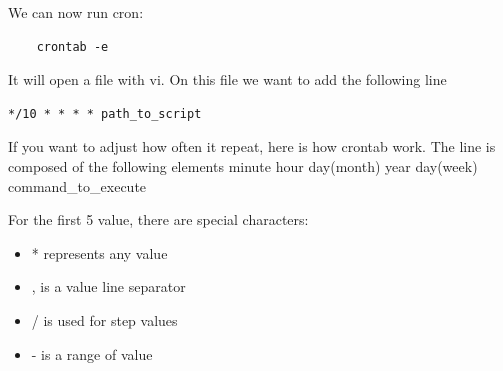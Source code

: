 We can now run cron:
\begin{lstlisting}
	crontab -e
\end{lstlisting}


It will open a file with vi. On this file we want to add the following line
\begin{lstlisting}
*/10 * * * * path_to_script
\end{lstlisting}



If you want to adjust how often it repeat, here is how crontab work. The line is composed of the following elements
minute hour day(month) year day(week) command\_to\_execute

For the first 5 value, there are special characters:
\begin{itemize}
	\item * represents any value
	\item , is a value line separator
	\item / is used for step values
	\item - is a range of value
\end{itemize} 


